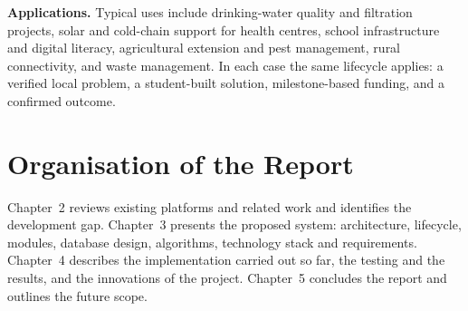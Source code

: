 \textbf{Applications.} Typical uses include drinking-water quality and filtration projects, solar and cold-chain support for health centres, school infrastructure and digital literacy, agricultural extension and pest management, rural connectivity, and waste management. In each case the same lifecycle applies: a verified local problem, a student-built solution, milestone-based funding, and a confirmed outcome.

\section{Organisation of the Report}
Chapter~2 reviews existing platforms and related work and identifies the development gap. Chapter~3 presents the proposed system: architecture, lifecycle, modules, database design, algorithms, technology stack and requirements. Chapter~4 describes the implementation carried out so far, the testing and the results, and the innovations of the project. Chapter~5 concludes the report and outlines the future scope.
